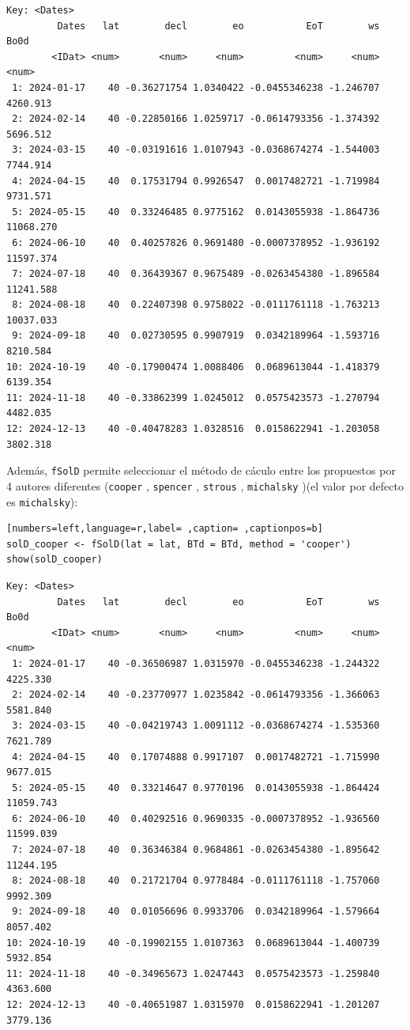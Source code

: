 \begin{verbatim}
Key: <Dates>
         Dates   lat        decl        eo           EoT        ws      Bo0d
        <IDat> <num>       <num>     <num>         <num>     <num>     <num>
 1: 2024-01-17    40 -0.36271754 1.0340422 -0.0455346238 -1.246707  4260.913
 2: 2024-02-14    40 -0.22850166 1.0259717 -0.0614793356 -1.374392  5696.512
 3: 2024-03-15    40 -0.03191616 1.0107943 -0.0368674274 -1.544003  7744.914
 4: 2024-04-15    40  0.17531794 0.9926547  0.0017482721 -1.719984  9731.571
 5: 2024-05-15    40  0.33246485 0.9775162  0.0143055938 -1.864736 11068.270
 6: 2024-06-10    40  0.40257826 0.9691480 -0.0007378952 -1.936192 11597.374
 7: 2024-07-18    40  0.36439367 0.9675489 -0.0263454380 -1.896584 11241.588
 8: 2024-08-18    40  0.22407398 0.9758022 -0.0111761118 -1.763213 10037.033
 9: 2024-09-18    40  0.02730595 0.9907919  0.0342189964 -1.593716  8210.584
10: 2024-10-19    40 -0.17900474 1.0088406  0.0689613044 -1.418379  6139.354
11: 2024-11-18    40 -0.33862399 1.0245012  0.0575423573 -1.270794  4482.035
12: 2024-12-13    40 -0.40478283 1.0328516  0.0158622941 -1.203058  3802.318
\end{verbatim}

Además, \texttt{fSolD} permite seleccionar el método de cáculo entre los propuestos por 4 autores diferentes (\texttt{cooper} \cite{Cooper1969}, \texttt{spencer} \cite{Spencer1971}, \texttt{strous} \cite{Strous2011}, \texttt{michalsky} \cite{Michalsky1988})(el valor por defecto es \texttt{michalsky}):
\begin{lstlisting}[numbers=left,language=r,label= ,caption= ,captionpos=b]
solD_cooper <- fSolD(lat = lat, BTd = BTd, method = 'cooper')
show(solD_cooper)
\end{lstlisting}

\begin{verbatim}
Key: <Dates>
         Dates   lat        decl        eo           EoT        ws      Bo0d
        <IDat> <num>       <num>     <num>         <num>     <num>     <num>
 1: 2024-01-17    40 -0.36506987 1.0315970 -0.0455346238 -1.244322  4225.330
 2: 2024-02-14    40 -0.23770977 1.0235842 -0.0614793356 -1.366063  5581.840
 3: 2024-03-15    40 -0.04219743 1.0091112 -0.0368674274 -1.535360  7621.789
 4: 2024-04-15    40  0.17074888 0.9917107  0.0017482721 -1.715990  9677.015
 5: 2024-05-15    40  0.33214647 0.9770196  0.0143055938 -1.864424 11059.743
 6: 2024-06-10    40  0.40292516 0.9690335 -0.0007378952 -1.936560 11599.039
 7: 2024-07-18    40  0.36346384 0.9684861 -0.0263454380 -1.895642 11244.195
 8: 2024-08-18    40  0.21721704 0.9778484 -0.0111761118 -1.757060  9992.309
 9: 2024-09-18    40  0.01056696 0.9933706  0.0342189964 -1.579664  8057.402
10: 2024-10-19    40 -0.19902155 1.0107363  0.0689613044 -1.400739  5932.854
11: 2024-11-18    40 -0.34965673 1.0247443  0.0575423573 -1.259840  4363.600
12: 2024-12-13    40 -0.40651987 1.0315970  0.0158622941 -1.201207  3779.136
\end{verbatim}

